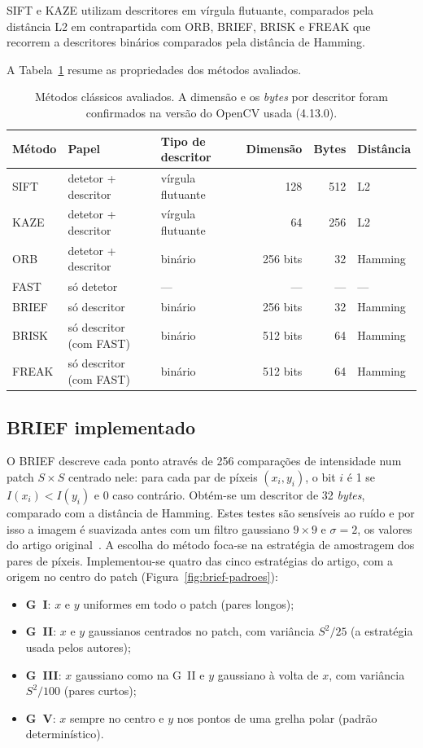 \documentclass[11pt,a4paper]{article}
\begin{document}
SIFT e KAZE utilizam descritores em vírgula flutuante, comparados pela distância L2 em contrapartida com ORB, BRIEF, BRISK e FREAK que recorrem a descritores binários comparados pela distância de Hamming. 

A Tabela~\ref{tab:metodos} resume as propriedades dos métodos avaliados.

\begin{table}[H]
\centering\small
\caption{Métodos clássicos avaliados. A dimensão e os \textit{bytes} por descritor foram confirmados na versão do OpenCV usada (4.13.0).}
\label{tab:metodos}
\begin{tabular}{lllrrl}
\toprule
Método & Papel & Tipo de descritor & Dimensão & Bytes & Distância \\
\midrule
SIFT  & detetor + descritor & vírgula flutuante & 128 & 512 & L2 \\
KAZE  & detetor + descritor & vírgula flutuante & 64 & 256 & L2 \\
ORB   & detetor + descritor & binário & 256 bits & 32 & Hamming \\
FAST  & só detetor & --- & --- & --- & --- \\
BRIEF & só descritor & binário & 256 bits & 32 & Hamming \\
BRISK & só descritor (com FAST) & binário & 512 bits & 64 & Hamming \\
FREAK & só descritor (com FAST) & binário & 512 bits & 64 & Hamming \\
\bottomrule
\end{tabular}
\end{table} 

\subsection{BRIEF implementado}
O BRIEF descreve cada ponto através de 256 comparações de intensidade num patch $S\times S$ centrado nele: para cada par de píxeis $(x_i, y_i)$, o bit $i$ é 1 se $I(x_i) < I(y_i)$ e 0 caso contrário. Obtém-se um descritor de 32 \textit{bytes}, comparado com a distância de Hamming. Estes testes são sensíveis ao ruído e por isso a imagem é suavizada antes com um filtro gaussiano $9\times9$ e $\sigma = 2$, os valores do artigo original~\cite{calonder2010}. A escolha do método foca-se na estratégia de amostragem dos pares de píxeis. Implementou-se quatro das cinco estratégias do artigo, com a origem no centro do patch (Figura~\ref{fig:brief-padroes}):
\begin{itemize}
  \item \textbf{G~I}: $x$ e $y$ uniformes em todo o patch (pares longos);
  \item \textbf{G~II}: $x$ e $y$ gaussianos centrados no patch, com variância $S^2/25$ (a estratégia
  usada pelos autores);
  \item \textbf{G~III}: $x$ gaussiano como na G~II e $y$ gaussiano à volta de $x$, com variância
  $S^2/100$ (pares curtos);
  \item \textbf{G~V}: $x$ sempre no centro e $y$ nos pontos de uma grelha polar (padrão
  determinístico).
\end{itemize}
\end{document}
